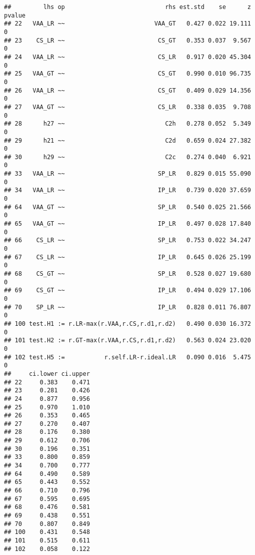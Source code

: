 \documentclass[
]{article}
\newenvironment{Shaded}{\begin{snugshade}}{\end{snugshade}}
\newcommand{\CommentTok}[1]{\textcolor[rgb]{0.56,0.35,0.01}{\textit{#1}}}
\newcommand{\DecValTok}[1]{\textcolor[rgb]{0.00,0.00,0.81}{#1}}
\newcommand{\KeywordTok}[1]{\textcolor[rgb]{0.13,0.29,0.53}{\textbf{#1}}}
\newcommand{\NormalTok}[1]{#1}
\newcommand{\OperatorTok}[1]{\textcolor[rgb]{0.81,0.36,0.00}{\textbf{#1}}}
\newcommand{\StringTok}[1]{\textcolor[rgb]{0.31,0.60,0.02}{#1}}
\begin{document}
\begin{verbatim}
##         lhs op                            rhs est.std    se      z pvalue
## 22   VAA_LR ~~                         VAA_GT   0.427 0.022 19.111      0
## 23    CS_LR ~~                          CS_GT   0.353 0.037  9.567      0
## 24   VAA_LR ~~                          CS_LR   0.917 0.020 45.304      0
## 25   VAA_GT ~~                          CS_GT   0.990 0.010 96.735      0
## 26   VAA_LR ~~                          CS_GT   0.409 0.029 14.356      0
## 27   VAA_GT ~~                          CS_LR   0.338 0.035  9.708      0
## 28      h27 ~~                            C2h   0.278 0.052  5.349      0
## 29      h21 ~~                            C2d   0.659 0.024 27.382      0
## 30      h29 ~~                            C2c   0.274 0.040  6.921      0
## 33   VAA_LR ~~                          SP_LR   0.829 0.015 55.090      0
## 34   VAA_LR ~~                          IP_LR   0.739 0.020 37.659      0
## 64   VAA_GT ~~                          SP_LR   0.540 0.025 21.566      0
## 65   VAA_GT ~~                          IP_LR   0.497 0.028 17.840      0
## 66    CS_LR ~~                          SP_LR   0.753 0.022 34.247      0
## 67    CS_LR ~~                          IP_LR   0.645 0.026 25.199      0
## 68    CS_GT ~~                          SP_LR   0.528 0.027 19.680      0
## 69    CS_GT ~~                          IP_LR   0.494 0.029 17.106      0
## 70    SP_LR ~~                          IP_LR   0.828 0.011 76.807      0
## 100 test.H1 := r.LR-max(r.VAA,r.CS,r.d1,r.d2)   0.490 0.030 16.372      0
## 101 test.H2 := r.GT-max(r.VAA,r.CS,r.d1,r.d2)   0.563 0.024 23.020      0
## 102 test.H5 :=           r.self.LR-r.ideal.LR   0.090 0.016  5.475      0
##     ci.lower ci.upper
## 22     0.383    0.471
## 23     0.281    0.426
## 24     0.877    0.956
## 25     0.970    1.010
## 26     0.353    0.465
## 27     0.270    0.407
## 28     0.176    0.380
## 29     0.612    0.706
## 30     0.196    0.351
## 33     0.800    0.859
## 34     0.700    0.777
## 64     0.490    0.589
## 65     0.443    0.552
## 66     0.710    0.796
## 67     0.595    0.695
## 68     0.476    0.581
## 69     0.438    0.551
## 70     0.807    0.849
## 100    0.431    0.548
## 101    0.515    0.611
## 102    0.058    0.122
\end{verbatim}

\begin{Shaded}
\end{Shaded}
\end{document}
